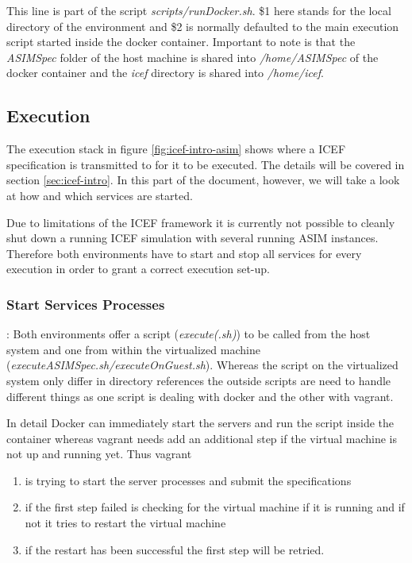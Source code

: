 This line is part of the script \textit{scripts/runDocker.sh}. \$1 here stands for the local directory of the environment and \$2 is normally defaulted to the main execution script started inside the docker container. Important to note is that the \textit{ASIMSpec} folder of the host machine is shared into \textit{/home/ASIMSpec} of the docker container and the \textit{icef} directory is shared into \textit{/home/icef}.

\subsection{Execution}
\label{sec:env-exec-stack-exe}

The execution stack in figure \ref{fig:icef-intro-asim} shows where a ICEF specification is transmitted to for it to be executed. The details will be covered in section \ref{sec:icef-intro}. In this part of the document, however, we will take a look at how and which services are started.

Due to limitations of the ICEF framework it is currently not possible to cleanly shut down a running ICEF simulation with several running ASIM instances. Therefore both environments have to start and stop all services for every execution in order to grant a correct execution set-up.

\subsubsection{Start Services Processes}: Both environments offer a script (\textit{execute(.sh)}) to be called from the host system and one from within the virtualized machine (\textit{executeASIMSpec.sh/executeOnGuest.sh}). Whereas the script on the virtualized system only differ in directory references the outside scripts are need to handle different things as one script is dealing with docker and the other with vagrant.

In detail Docker can immediately start the servers and run the script inside the container whereas vagrant needs add an additional step if the virtual machine is not up and running yet. Thus vagrant

\begin{enumerate}
	\item is trying to start the server processes and submit the specifications
	\item if the first step failed is checking for the virtual machine if it is running and if not it tries to restart the virtual machine
	\item if the restart has been successful the first step will be retried.
\end{enumerate}

